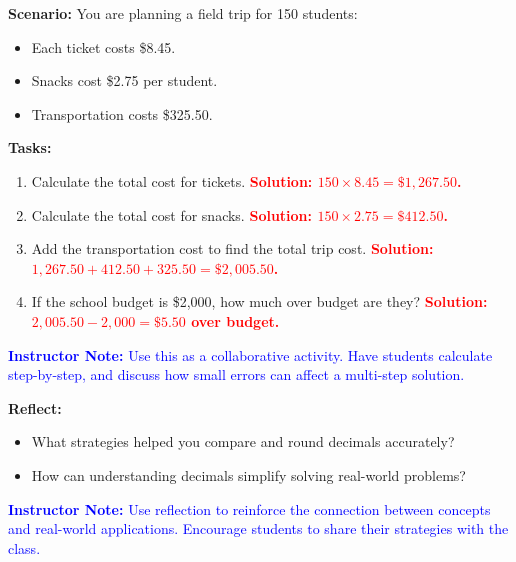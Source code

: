\documentclass[12pt]{article}
\begin{document}
\begin{tcolorbox}[colframe=black!60, colback=white, 
coltitle=black, colbacktitle=black!15, fonttitle=\bfseries\Large, 
title=Performance Task: Real-World Problem, halign title=center, left=10pt, right=10pt, top=10pt, bottom=15pt]
\textbf{Scenario:}
You are planning a field trip for 150 students:
\begin{itemize}
    \item Each ticket costs \$8.45.
    \item Snacks cost \$2.75 per student.
    \item Transportation costs \$325.50.
\end{itemize}

\textbf{Tasks:}
\begin{enumerate}[itemsep=1em]
    \item Calculate the total cost for tickets. \textcolor{red}{\textbf{Solution: \( 150 \times 8.45 = \$1,267.50 \).}}  
    \item Calculate the total cost for snacks. \textcolor{red}{\textbf{Solution: \( 150 \times 2.75 = \$412.50 \).}}
    \item Add the transportation cost to find the total trip cost. \textcolor{red}{\textbf{Solution: \( 1,267.50 + 412.50 + 325.50 = \$2,005.50 \).}}
    \item If the school budget is \$2,000, how much over budget are they? \textcolor{red}{\textbf{Solution: \( 2,005.50 - 2,000 = \$5.50 \) over budget.}}
\end{enumerate}

\textcolor{blue}{\textbf{Instructor Note:} Use this as a collaborative activity. Have students calculate step-by-step, and discuss how small errors can affect a multi-step solution.}
\end{tcolorbox}

\vspace{1em}

\begin{tcolorbox}[colframe=black!60, colback=white, 
coltitle=black, colbacktitle=black!15, fonttitle=\bfseries\Large, 
title=Reflection, halign title=center, left=10pt, right=10pt, top=10pt, bottom=15pt]
\textbf{Reflect:}
\begin{itemize}
    \item What strategies helped you compare and round decimals accurately?
    \item How can understanding decimals simplify solving real-world problems?
\end{itemize}

\textcolor{blue}{\textbf{Instructor Note:} Use reflection to reinforce the connection between concepts and real-world applications. Encourage students to share their strategies with the class.}
\end{tcolorbox}
\end{document}
